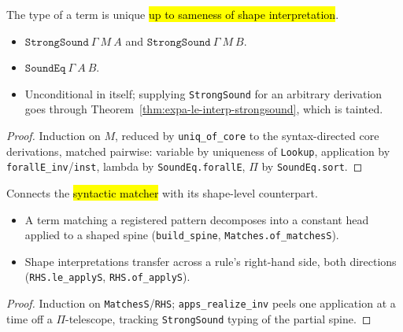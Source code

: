 \begin{theorem}
\label{thm:expa-strongsound-uniq}
\leanok
{}

 The type of a term is unique \hl{up to sameness of shape interpretation}.
\begin{itemize}
\item {} $\mathtt{StrongSound}\ \Gamma\ M\ A$ and $\mathtt{StrongSound}\ \Gamma\ M\ B$.
\item {} $\mathtt{SoundEq}\ \Gamma\ A\ B$.
\item {} Unconditional in itself; supplying \texttt{StrongSound} for an arbitrary
derivation goes through Theorem~\ref{thm:expa-le-interp-strongsound}, which is tainted.
\end{itemize}
\end{theorem}
\begin{proof}
\leanok
{} Induction on $M$, reduced by \texttt{uniq\_of\_core} to the syntax-directed core
derivations, matched pairwise: variable by uniqueness of \texttt{Lookup}, application by
\texttt{forallE\_inv}/\texttt{inst}, lambda by \texttt{SoundEq.forallE}, $\Pi$ by
\texttt{SoundEq.sort}.
\end{proof}

\begin{lemma}
\label{thm:expa-build-spine}
\leanok
{}

 Connects the \hl{syntactic matcher} with its shape-level counterpart.
\begin{itemize}
\item A term matching a registered pattern decomposes into a constant head applied to a shaped spine
(\texttt{build\_spine}, \texttt{Matches.of\_matchesS}).
\item Shape interpretations transfer across a rule's right-hand side, both directions
(\texttt{RHS.le\_applyS}, \texttt{RHS.of\_applyS}).
\end{itemize}
\end{lemma}
\begin{proof}
\leanok
{} Induction on \texttt{MatchesS}/\texttt{RHS}; \texttt{apps\_realize\_inv} peels one
application at a time off a $\Pi$-telescope, tracking \texttt{StrongSound} typing of the partial
spine.
\end{proof}

